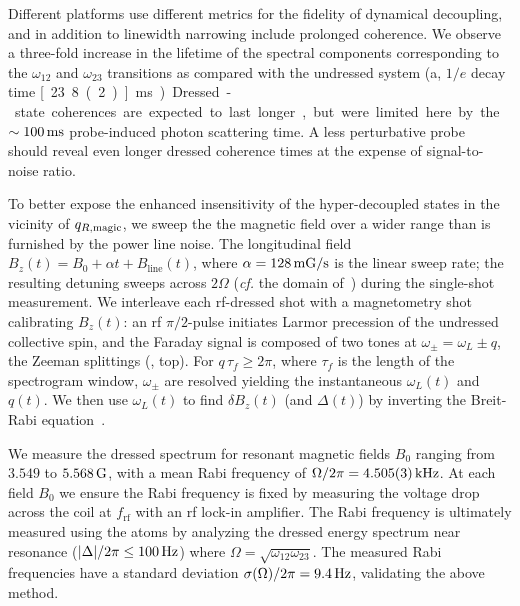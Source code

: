 \documentclass[aps,prl,reprint,superscriptaddress,floatfix]{revtex4-1}
\begin{document}
Different platforms use different metrics for the fidelity of dynamical decoupling, and in addition to linewidth narrowing include prolonged coherence.
We observe a three-fold increase in the lifetime of the spectral components corresponding to the $\omega_{12}$ and $\omega_{23}$ transitions as compared with the undressed system (a, $1/e$ decay time \unit[23.8(2)]{ms}).
Dressed-state coherences are expected to last longer, but were limited here by the $\sim\unit[100]{ms}$ probe-induced photon scattering time.
A less perturbative probe~\cite{jasperse_magic-wavelength_2017} should reveal even longer dressed coherence times at the expense of signal-to-noise ratio. 

To better expose the enhanced insensitivity of the hyper-decoupled states in the vicinity of $q_{R,\text{magic}}$, we sweep the the magnetic field over a wider range than is furnished by the power line noise.
The longitudinal field $B_z(t) = B_0 + \alpha t + B_{\text{line}}(t)$, where $\alpha = \unit[128]{mG/s}$ is the linear sweep rate; the resulting detuning sweeps across $2\Omega$ (\textit{cf.} the domain of~) during the single-shot measurement.
We interleave each rf-dressed shot with a magnetometry shot calibrating $B_z(t)$: an rf $\pi/2$-pulse initiates Larmor precession of the undressed collective spin, and the Faraday signal is composed of two tones at $\omega_\pm = \omega_L \pm q$, the Zeeman splittings (, top).
For $q \, \tau_f \geq 2\pi$, where $\tau_f$ is the length of the spectrogram window, $\omega_\pm$ are resolved yielding the instantaneous $\omega_L(t)$ and $q(t)$.
We then use $\omega_L(t)$ to find $\delta B_z(t)$ (and $\Delta(t)$) by inverting the Breit-Rabi equation~\cite{ramsey_molecular_1956}.

We measure the dressed spectrum for resonant magnetic fields $B_0$ ranging from $3.549$ to $\unit[5.568]{G}$, with a mean Rabi frequency of $\Omega/2\pi = \unit[4.505(3)]{kHz}$.
At each field $B_0$ we ensure the Rabi frequency is fixed by measuring the voltage drop across the coil at $f_{\text{rf}}$ with an rf lock-in amplifier.
The Rabi frequency is ultimately measured using the atoms by analyzing the dressed energy spectrum near resonance ($\abs{\Delta}/2\pi \leq \unit[100]{Hz}$) where $\Omega = \sqrt{\omega_{12} \omega_{23}}$.
The measured Rabi frequencies have a standard deviation $\sigma(\Omega)/2\pi = \unit[9.4]{Hz}$, validating the above method.
\end{document}
